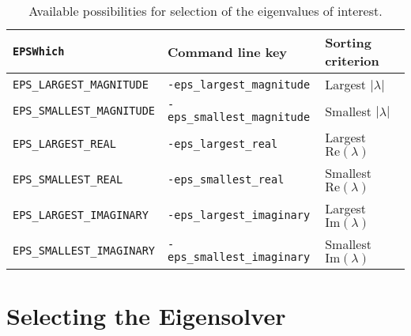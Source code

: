 \begin{table}[t]
\centering
{\small \begin{tabular}{lll}
\texttt{EPSWhich}                  & Command line key                   & Sorting criterion \\\hline
\texttt{EPS\_LARGEST\_MAGNITUDE}   & \texttt{-eps\_largest\_magnitude}  & Largest $|\lambda|$ \\
\texttt{EPS\_SMALLEST\_MAGNITUDE}  & \texttt{-eps\_smallest\_magnitude} & Smallest $|\lambda|$ \\
\texttt{EPS\_LARGEST\_REAL}        & \texttt{-eps\_largest\_real}       & Largest $\mathrm{Re}(\lambda)$ \\
\texttt{EPS\_SMALLEST\_REAL}       & \texttt{-eps\_smallest\_real}      & Smallest $\mathrm{Re}(\lambda)$ \\
\texttt{EPS\_LARGEST\_IMAGINARY}   & \texttt{-eps\_largest\_imaginary}  & Largest $\mathrm{Im}(\lambda)$\footnotemark \\
\texttt{EPS\_SMALLEST\_IMAGINARY}  & \texttt{-eps\_smallest\_imaginary} & Smallest $\mathrm{Im}(\lambda)$\addtocounter{footnote}{-1}\footnotemark \\\hline
\end{tabular} }
\caption{\label{tab:portion}Available possibilities for selection of the eigenvalues of interest.}
\end{table}



\section{Selecting the Eigensolver}

